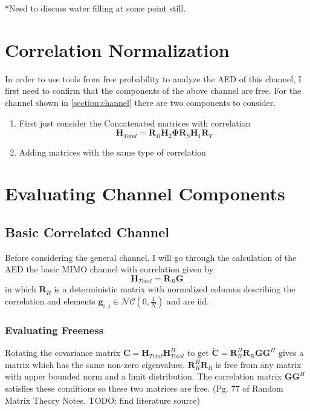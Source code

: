 \documentclass[12pt,a4paper]{report}
\begin{document}
*Need to discuss water filling at some point still.

\section{Correlation Normalization}
In order to use tools from free probability to analyze the AED of this channel, I first need to confirm that the components of the above channel are free. For the channel shown in \ref{section:channel} there are two components  to consider.
\begin{enumerate}
\item 
	First just consider the Concatenated matrices with correlation
	\begin{equation}
	\mathbf{H}_{Total} = \mathbf{R}_{R}\mathbf{H}_{2}\boldsymbol{\Phi}\mathbf{R}_{S}\mathbf{H}_{1}\mathbf{R}_{T}
	\end{equation}

\item 
	Adding matrices with the same type of correlation	
\end{enumerate}

\section{Evaluating Channel Components}

\subsection{Basic Correlated Channel}\label{ssection:basic_correlation}
	Before considering the general channel,  I will go through the calculation of the AED the basic MIMO 
	channel with correlation given by
	\begin{equation}
	\mathbf{H}_{Total} = \mathbf{R}_{R}\mathbf{G}
	\end{equation}
	in which $\mathbf{R}_{R}$ is a deterministic matrix with normalized columns describing the correlation and
	elements $\mathbf{g}_{i,j} \in \mathcal{NC}(0,\frac{1}{N})$ and are iid.
	
\subsubsection{Evaluating Freeness}
Rotating the covariance matrix $\mathbf{C} = \mathbf{H}_{Total} \mathbf{H}_{Total}^H$ to get $ \tilde{\mathbf{C}}=\mathbf{R}_{R}^H \mathbf{R}_{R} \mathbf{G} \mathbf{G}^H
$ gives a matrix which has the same non-zero eigenvalues. 
$ \mathbf{R}_{R}^H \mathbf{R}_{R}$ is free from any matrix with upper bounded norm and a limit distribution.
The correlation matrix $\mathbf{G} \mathbf{G}^H$ satisfies these conditions so these two matrices are free. 
(Pg. 77 of Random Matrix Theory Notes. TODO: find literature source)
\end{document}
